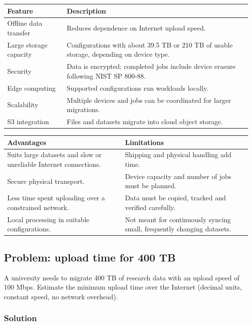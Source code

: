 \documentclass[11pt,a4paper]{article}
\begin{document}
\begin{tabularx}{\textwidth}{@{}lX@{}}
\toprule
\rowcolor{tablehead}\textbf{Feature} & \textbf{Description} \\
\midrule
Offline data transfer & Reduces dependence on Internet upload speed. \\
Large storage capacity & Configurations with about 39.5 TB or 210 TB of usable storage,
  depending on device type. \\
Security & Data is encrypted; completed jobs include device erasure following NIST SP 800-88. \\
Edge computing & Supported configurations run workloads locally. \\
Scalability & Multiple devices and jobs can be coordinated for larger migrations. \\
S3 integration & Files and datasets migrate into cloud object storage. \\
\bottomrule
\end{tabularx}

\medskip
\begin{tabularx}{\textwidth}{@{}XX@{}}
\toprule
\rowcolor{tablehead}\textbf{Advantages} & \textbf{Limitations} \\
\midrule
Suits large datasets and slow or unreliable Internet connections. & Shipping and physical
  handling add time. \\
Secure physical transport. & Device capacity and number of jobs must be planned. \\
Less time spent uploading over a constrained network. & Data must be copied, tracked and
  verified carefully. \\
Local processing in suitable configurations. & Not meant for continuously syncing small,
  frequently changing datasets. \\
\bottomrule
\end{tabularx}

\subsection*{Problem: upload time for 400 TB}

A university needs to migrate 400 TB of research data with an upload speed of 100 Mbps.
Estimate the minimum upload time over the Internet (decimal units, constant speed, no
network overhead).

\subsubsection*{Solution}
\end{document}
